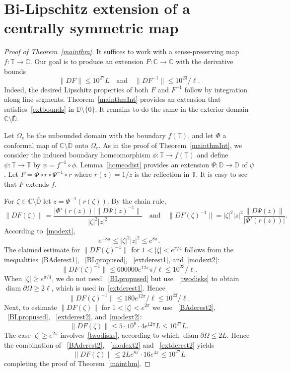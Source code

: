 \documentclass[11pt]{amsart}
\theoremstyle{remark}
\numberwithin{equation}{section}
\newcommand{\C}{\mathbb{C}}
\newcommand{\DD}{\mathbb{D}}
\newcommand{\T}{\mathbb{T}}
\newcommand{\abs}[1]{\lvert#1\rvert}
\newcommand{\norm}[1]{\lVert#1\rVert}
\DeclareMathOperator{\diam}{diam}
\begin{document}
\section{Bi-Lipschitz extension of a centrally symmetric map}\label{globalsec}

\begin{proof}[Proof of Theorem~\ref{mainthm}] 
It suffices to work with a sense-preserving map $f\colon \T\to\C$. 
Our goal is to produce an extension $F\colon \C\to \C$ with the derivative bounds 
\begin{equation}\label{extbounds}
\norm{DF}\le 10^{27} L \quad \text{and} \quad  \norm{DF^{-1}} \le 10^{23} / \ell. 
\end{equation}
Indeed, the desired Lipschitz properties of both $F$ and $F^{-1}$ follow by integration along line segments.  Theorem~\ref{mainthmInt} provides an extension that satisfies~\eqref{extbounds} in $\DD\setminus\{0\}$. It remains to do the same in the exterior domain $\C\setminus\overline{\DD}$.  

Let $\Omega_e$ be the unbounded domain with the boundary $f(\T)$, and let $\Phi$ a conformal map of $\C\setminus\overline{\DD}$ onto $\Omega_e$. As in the proof of Theorem~\ref{mainthmInt}, we consider  
the induced boundary homeomorphism $\phi\colon \T\to f(\T)$ and define $\psi\colon \T\to\T$ by $\psi = f^{-1}\circ \phi$. Lemma~\ref{homeodist} provides an extension $\Psi\colon \DD\to\DD$ of $\psi$. Let 
$F = \Phi\circ r\circ \Psi^{-1}\circ r$ where $r(z) = 1/\bar z$ is the reflection in $\T$. It is easy to see that $F$ extends $f$. 

For $\zeta\in\C\setminus\overline{\DD} $ let $z = \Psi^{-1}(r(\zeta))$. By the chain rule, 
\[
\norm{DF(\zeta)} = \frac{\abs{\Phi'(r(z))} \norm{D\Psi(z)^{-1}}}{\abs{\zeta}^2\abs{z}^2} \quad 
\text{and} \quad 
\norm{DF(\zeta)^{-1}} = \abs{\zeta}^2\abs{z}^2\frac{\norm{D\Psi(z)}}{\abs{\Phi'(r(z))}}.
\]
According to~\eqref{modext},
\begin{equation}\label{modext2}
e^{-8\pi} \le \abs{\zeta}^2\abs{z}^2\le e^{8\pi}. 
\end{equation}
The claimed estimate for $\norm{DF(\zeta)^{-1}}$ for $1<\abs{\zeta}<e^{\pi/4}$  follows from the inequalities~\eqref{BAderest1}, ~\eqref{BLpropused},  ~\eqref{extderest1}, and~\eqref{modext2}:
\[
\norm{DF(\zeta)^{-1}} \le 600000 e^{12\pi}\pi /\ell \le 10^{23}/\ell.
\]
When $\abs{\zeta}\ge e^{\pi/4}$, we do not need ~\eqref{BLpropused} but use ~\eqref{twodisks} to obtain $\diam \partial\Omega \ge 2\ell$, which is used in~\eqref{extderest1}. Hence 
\[
\norm{DF(\zeta)^{-1}} \le 180e^{12\pi} /\ell  \le 10^{23}/\ell.
\]
Next, to estimate $\norm{DF(\zeta)}$ for $1<\abs{\zeta}<e^{2\pi}$ we use ~\eqref{BAderest2}, ~\eqref{BLpropused},  ~\eqref{extderest2}, and~\eqref{modext2}:
\[
\norm{DF(\zeta)} \le 5\cdot 10^9\cdot 4  e^{12\pi} L \le 10^{27}L. 
\]
The case $\abs{\zeta}\ge e^{2\pi}$ involves~\eqref{twodisks}, according to which $\diam \partial\Omega \le 2L$. Hence the combination of ~\eqref{BAderest2}, ~\eqref{modext2} and ~\eqref{extderest2} yields 
\[
\norm{DF(\zeta)} \le 2L  e^{8\pi}\cdot  16 e^{4\pi} \le 10^{27}L 
\]
completing the proof of Theorem~\ref{mainthm}. 
\end{proof}
\end{document}
